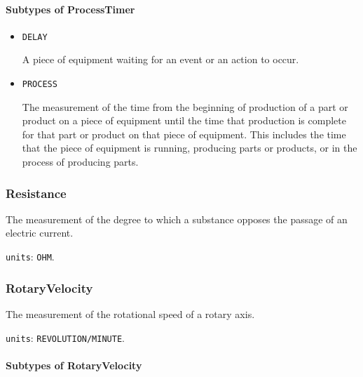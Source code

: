 \paragraph{Subtypes of ProcessTimer}\mbox{}
\label{sec:Subtypes of ProcessTimer}

\begin{itemize}

\item \texttt{DELAY}


A piece of equipment waiting for an event or an action to occur.

\item \texttt{PROCESS}


The measurement of the time from the beginning of production of a part or product on a piece of equipment until the time that production is complete for that part or product on that piece of equipment.  This includes the time that the piece of equipment is running, producing parts or products, or in the process of producing parts.


\end{itemize}





\subsubsection{Resistance}
\label{sec:Resistance}



The measurement of the degree to which a substance opposes the passage of an electric current.


\texttt{units}: \texttt{OHM}.


\subsubsection{RotaryVelocity}
\label{sec:RotaryVelocity}



The measurement of the rotational speed of a rotary axis.


\texttt{units}: \texttt{REVOLUTION/MINUTE}.

\paragraph{Subtypes of RotaryVelocity}\mbox{}
\label{sec:Subtypes of RotaryVelocity}

